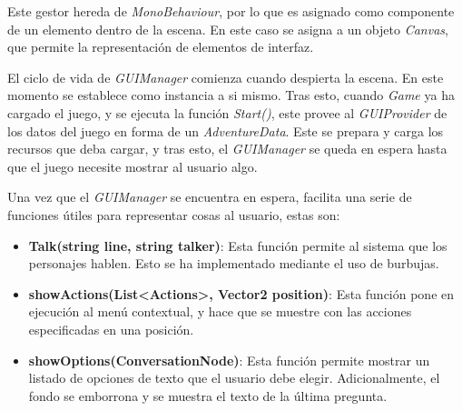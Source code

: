 Este gestor hereda de \textit{MonoBehaviour}, por lo que es asignado como componente de un elemento dentro de la escena. En este caso se asigna a un objeto \textit{Canvas}, que permite la representación de elementos de interfaz. 

El ciclo de vida de \textit{GUIManager} comienza cuando despierta la escena. En este momento se establece como instancia a si mismo. Tras esto, cuando \textit{Game} ya ha cargado el juego, y se ejecuta la función \textit{Start()}, este provee al \textit{GUIProvider} de los datos del juego en forma de un \textit{AdventureData}. Este se prepara y carga los recursos que deba cargar, y tras esto, el \textit{GUIManager} se queda en espera hasta que el juego necesite mostrar al usuario algo.

Una vez que el \textit{GUIManager} se encuentra en espera, facilita una serie de funciones útiles para representar cosas al usuario, estas son:
\begin{itemize}
	\item \textbf{Talk(string line, string talker)}: Esta función permite al sistema que los personajes hablen. Esto se ha implementado mediante el uso de burbujas.
	
	\item \textbf{showActions(List<Actions>, Vector2 position)}: Esta función pone en ejecución al menú contextual, y hace que se muestre con las acciones especificadas en una posición.
	
	\item \textbf{showOptions(ConversationNode)}: Esta función permite mostrar un listado de opciones de texto que el usuario debe elegir. Adicionalmente, el fondo se emborrona y se muestra el texto de la última pregunta.
	
\end{itemize}


